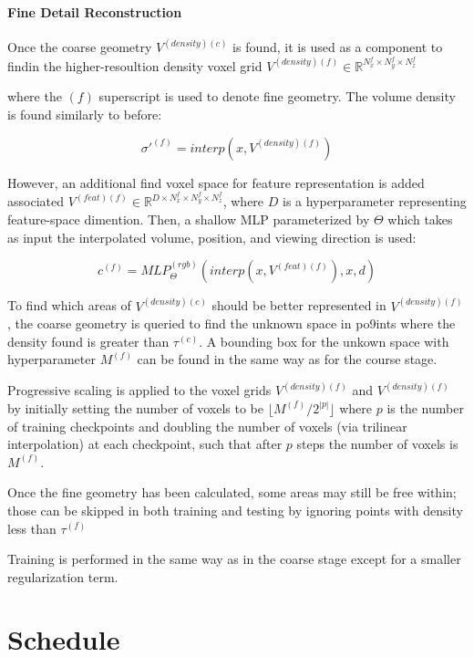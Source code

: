 \documentclass[conference]{IEEEtran}
\begin{document}
\paragraph{Fine Detail Reconstruction}

Once the coarse geometry \(V^{(density)(c)}\) is found, it is used as a component to
findin the higher-resoultion density voxel grid
\(V^{(density)(f)} \in \mathbb{R}^{N_x^f \times N_y^f \times N_z^f}\)

where the \((f)\) superscript is used to denote fine geometry. The volume density
is found similarly to before:

\[\sigma'^{(f)} = interp(x, V^{(density)(f)})\]

However, an additional find voxel space for feature representation is added associated
\(V^{(feat)(f)} \in \mathbb{R}^{D \times N_x^f \times N_y^f \times N_z^f}\), where \(D\) is
a hyperparameter representing feature-space dimention. Then, a shallow MLP
parameterized by \(\Theta\) which takes as input the interpolated volume, position,
and viewing direction is used:

\[c^{(f)} = MLP_{\Theta}^{(rgb)}(interp(x, V^{(feat)(f)}), x, d)\]

To find which areas of \(V^{(density)(c)}\) should be better represented in
\(V^{(density)(f)}\), the coarse geometry is queried to find the unknown space in
po9ints where the density found is greater than \(\tau^{(c)}\). A bounding box
for the unkown space with hyperparameter \(M^{(f)}\) can be found in the same way as
for the course stage.

Progressive scaling is applied to the voxel grids \(V^{(density)(f)}\)
and \(V^{(density)(f)}\) by initially setting the number of voxels to be
\(\lfloor M^{(f)} / 2^{|p|} \rfloor\)
where \(p\) is the number of training checkpoints and doubling the number
of voxels (via trilinear interpolation) at each checkpoint, such that after \(p\)
steps the number of voxels is \(M^{(f)}\).

Once the fine geometry has been calculated, some areas may still be free within;
those can be skipped in both training and testing by ignoring points with
density less than \(\tau^{(f)}\)

Training is performed in the same way as in the coarse stage except for a smaller
regularization term.


\section{Schedule}
\end{document}
